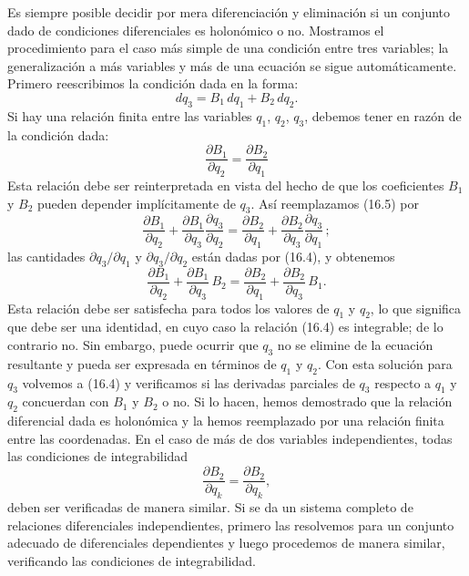 \documentclass[12pt,a4paper]{book}
\begin{document}
\begin{center}
Es siempre posible decidir por mera diferenciaci\'on y eliminaci\'on si un conjunto dado de condiciones diferenciales es holon\'omico o no. Mostramos el procedimiento para el caso m\'as simple de una condici\'on entre tres variables; la generalizaci\'on a m\'as variables y m\'as de una ecuaci\'on se sigue autom\'aticamente. Primero reescribimos la condici\'on dada en la forma:
\begin{equation}
dq_3 = B_1\,dq_1 + B_2\,dq_2.
\tag{16.4}
\end{equation}
Si hay una relaci\'on finita entre las variables $q_1$, $q_2$, $q_3$, debemos tener en raz\'on de la condici\'on dada:
\begin{equation}
\frac{\partial B_1}{\partial q_2} = \frac{\partial B_2}{\partial q_1}
\tag{16.5}
\end{equation}
Esta relaci\'on debe ser reinterpretada en vista del hecho de que los coeficientes $B_1$ y $B_2$ pueden depender impl\'icitamente de $q_3$. As\'i reemplazamos (16.5) por
\begin{equation}
\frac{\partial B_1}{\partial q_2} + \frac{\partial B_1}{\partial q_3}\frac{\partial q_3}{\partial q_2} = \frac{\partial B_2}{\partial q_1} + \frac{\partial B_2}{\partial q_3}\frac{\partial q_3}{\partial q_1}\,;
\tag{16.6}
\end{equation}
las cantidades $\partial q_3/\partial q_1$ y $\partial q_3/\partial q_2$ est\'an dadas por (16.4), y obtenemos
\begin{equation}
\frac{\partial B_1}{\partial q_2} + \frac{\partial B_1}{\partial q_3}\,B_2 = \frac{\partial B_2}{\partial q_1} + \frac{\partial B_2}{\partial q_3}\,B_1.
\tag{16.7}
\end{equation}
Esta relaci\'on debe ser satisfecha para todos los valores de $q_1$ y $q_2$, lo que significa que debe ser una identidad, en cuyo caso la relaci\'on (16.4) es integrable; de lo contrario no. Sin embargo, puede ocurrir que $q_3$ no se elimine de la ecuaci\'on resultante y pueda ser expresada en t\'erminos de $q_1$ y $q_2$. Con esta soluci\'on para $q_3$ volvemos a (16.4) y verificamos si las derivadas parciales de $q_3$ respecto a $q_1$ y $q_2$ concuerdan con $B_1$ y $B_2$ o no. Si lo hacen, hemos demostrado que la relaci\'on diferencial dada es holon\'omica y la hemos reemplazado por una relaci\'on finita entre las coordenadas. En el caso de m\'as de dos variables independientes, todas las condiciones de integrabilidad
\begin{equation}
\frac{\partial B_2}{\partial q_k} = \frac{\partial B_2}{\partial q_k},
\tag{16.8}
\end{equation}
deben ser verificadas de manera similar. Si se da un sistema completo de relaciones diferenciales independientes, primero las resolvemos para un conjunto adecuado de diferenciales dependientes y luego procedemos de manera similar, verificando las condiciones de integrabilidad.


\end{center}
\end{document}
